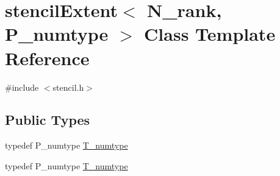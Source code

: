 \hypertarget{classstencilExtent}{}\section{stencil\+Extent$<$ N\+\_\+rank, P\+\_\+numtype $>$ Class Template Reference}
\label{classstencilExtent}


{\ttfamily \#include $<$stencil.\+h$>$}

\subsection*{Public Types}
\begin{DoxyCompactItemize}
\item 
typedef P\+\_\+numtype \hyperlink{classstencilExtent_a93a97a73c5ca309121de8deb65521b0a}{T\+\_\+numtype}
\item 
typedef P\+\_\+numtype \hyperlink{classstencilExtent_a93a97a73c5ca309121de8deb65521b0a}{T\+\_\+numtype}
\end{DoxyCompactItemize}
